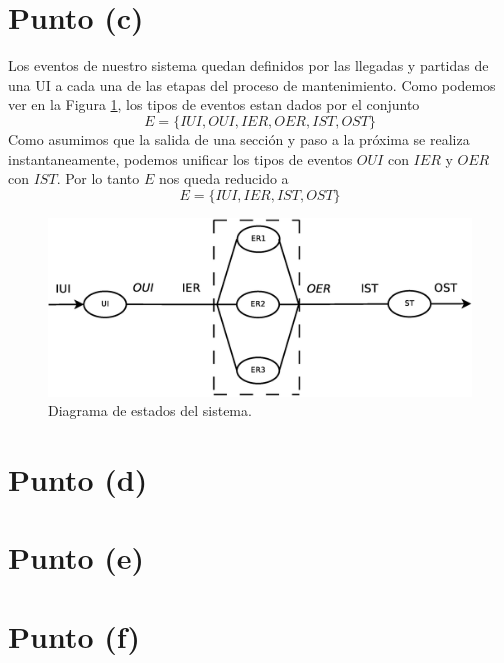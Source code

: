 \documentclass[a4paper,10pt]{article}
\begin{document}
\section{Punto (c)}
Los eventos de nuestro sistema quedan definidos por las llegadas y partidas de una UI a cada una de las etapas del proceso de mantenimiento. Como podemos ver en la Figura \ref{fig:events_diagram}, los tipos de eventos estan dados por el conjunto
\[
 E = \{IUI, OUI, IER, OER, IST, OST\}
\]
Como asumimos que la salida de una sección y paso a la próxima se realiza instantaneamente, podemos unificar los tipos de eventos $OUI$ con $IER$ y $OER$ con $IST$. Por lo tanto $E$ nos queda reducido a
\[
 E = \{IUI, IER, IST, OST\}
\]

\begin{figure}[h]
\begin{center}
\includegraphics[width=12cm]{./states.eps}
\caption{\label{fig:events_diagram} Diagrama de estados del sistema.}
\end{center}
\end{figure}



\section{Punto (d)}

\section{Punto (e)}

\section{Punto (f)}
\end{document}
